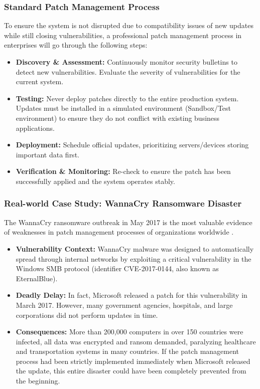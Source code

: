 \subsubsection{Standard Patch Management Process}

To ensure the system is not disrupted due to compatibility issues of new updates while still closing vulnerabilities, a professional patch management process in enterprises will go through the following steps:

\begin{itemize}
    \item \textbf{Discovery \& Assessment:} Continuously monitor security bulletins to detect new vulnerabilities. Evaluate the severity of vulnerabilities for the current system.
    
    \item \textbf{Testing:} Never deploy patches directly to the entire production system. Updates must be installed in a simulated environment (Sandbox/Test environment) to ensure they do not conflict with existing business applications.
    
    \item \textbf{Deployment:} Schedule official updates, prioritizing servers/devices storing important data first.
    
    \item \textbf{Verification \& Monitoring:} Re-check to ensure the patch has been successfully applied and the system operates stably.
\end{itemize}

\subsubsection{Real-world Case Study: WannaCry Ransomware Disaster}

The WannaCry ransomware outbreak in May 2017 is the most valuable evidence of weaknesses in patch management processes of organizations worldwide \cite{ref5}.

\begin{itemize}
    \item \textbf{Vulnerability Context:} WannaCry malware was designed to automatically spread through internal networks by exploiting a critical vulnerability in the Windows SMB protocol (identifier CVE-2017-0144, also known as EternalBlue).
    
    \item \textbf{Deadly Delay:} In fact, Microsoft released a patch for this vulnerability in March 2017. However, many government agencies, hospitals, and large corporations did not perform updates in time.
    
    \item \textbf{Consequences:} More than 200,000 computers in over 150 countries were infected, all data was encrypted and ransom demanded, paralyzing healthcare and transportation systems in many countries. If the patch management process had been strictly implemented immediately when Microsoft released the update, this entire disaster could have been completely prevented from the beginning.
\end{itemize}

